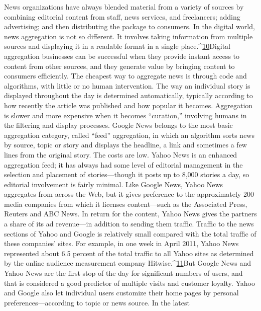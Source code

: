 News organizations have always blended material from a variety of sources
by combining editorial content from staff, news services, and freelancers; adding
advertising; and then distributing the package to consumers. In the digital
world, news aggregation is not so different. It involves taking information from
multiple sources and displaying it in a readable format in a single place.^{\href{#endnotes-chapter-6}{10}}Digital
aggregation businesses can be successful when they provide instant access
to content from other sources, and they generate value by bringing content to
consumers efficiently.
The cheapest way to aggregate news is through code and algorithms, with little
or no human intervention. The way an individual story is displayed throughout
the day is determined automatically, typically according to how recently the article
was published and how popular it becomes. Aggregation is slower and more
expensive when it becomes ``curation,'' involving humans in the filtering and
display processes.
Google News belongs to the most basic aggregation category, called ``feed'' aggregation,
in which an algorithm sorts news by source, topic or story and displays
the headline, a link and sometimes a few lines from the original story. The costs
are low.
Yahoo News is an enhanced aggregation feed; it has always had some level of
editorial management in the selection and placement of stories—though it posts
up to 8,000 stories a day, so editorial involvement is fairly minimal. Like Google
News, Yahoo News aggregates from across the Web, but it gives preference to the
approximately 200 media companies from which it licenses content—such as the
Associated Press, Reuters and ABC News. In return for the content, Yahoo News
gives the partners a share of its ad revenue—in addition to sending them traffic.
Traffic to the news sections of Yahoo and Google is relatively small compared
with the total traffic of these companies' sites. For example, in one week in April
2011, Yahoo News represented about 6.5 percent of the total traffic to all Yahoo
sites as determined by the online audience measurement company Hitwise.^{\href{#endnotes-chapter-6}{11}}But
Google News and Yahoo News are the first stop of the day for significant numbers
of users, and that is considered a good predictor of multiple visits and customer
loyalty. Yahoo and Google also let individual users customize their home
pages by personal preferences—according to topic or news source. In the latest

